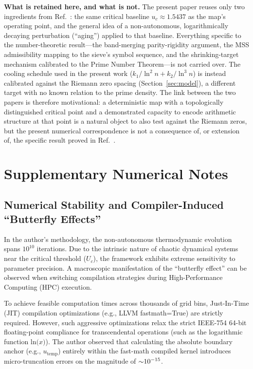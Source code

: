 \documentclass[mca,article,submit,oneauthor,pdftex]{Definitions/mdpi}
\begin{document}
\textbf{What is retained here, and what is not.} The present paper reuses
only two ingredients from Ref.~\cite{wang2026}: the same critical baseline
$u_c\approx1.5437$ as the map's operating point, and the general idea of a
non-autonomous, logarithmically decaying perturbation (``aging'') applied
to that baseline. Everything specific to the number-theoretic result---the
band-merging parity-rigidity argument, the MSS admissibility mapping to
the sieve's symbol sequence, and the shrinking-target mechanism calibrated
to the Prime Number Theorem---is not carried over. The cooling schedule
used in the present work ($k_1/\ln^2 n + k_2/\ln^3 n$) is instead
calibrated against the Riemann zero spacing (Section~\ref{sec:model}), a
different target with no known relation to the prime density. The link
between the two papers is therefore motivational: a deterministic map with
a topologically distinguished critical point and a demonstrated capacity to
encode arithmetic structure at that point is a natural object to also test
against the Riemann zeros, but the present numerical correspondence is not
a consequence of, or extension of, the specific result proved in
Ref.~\cite{wang2026}.

\section{Supplementary Numerical Notes}

\subsection{Numerical Stability and Compiler-Induced ``Butterfly Effects''}

In the author's methodology, the non-autonomous thermodynamic evolution spans
\(\text{10}^{\text{10}}\) iterations. Due to the intrinsic nature of
chaotic dynamical systems near the critical threshold
(\({U}_{{c}}\)), the framework exhibits extreme sensitivity to
parameter precision. A macroscopic manifestation of the ``butterfly
effect'' can be observed when switching compilation strategies during
High-Performance Computing (HPC) execution.

To achieve feasible computation times across thousands of grid bins,
Just-In-Time (JIT) compilation optimizations (e.g., LLVM fastmath=True)
are strictly required. However, such aggressive optimizations relax the
strict IEEE-754 64-bit floating-point compliance for transcendental
operations (such as the logarithmic function
\(\text{ln(}{x}\text{)}\)). The author observed that calculating the
absolute boundary anchor (e.g., \({u}_{\text{temp}}\)) entirely
within the fast-math compiled kernel introduces micro-truncation errors
on the magnitude of \(\text{\ensuremath{\sim}}\text{10}^{\text{\ensuremath{-}15}}\).
\end{document}
